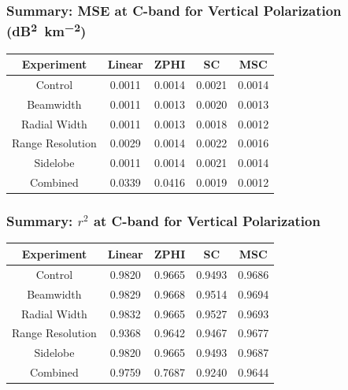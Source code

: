\documentclass[red]{beamer}
\begin{document}
\begin{frame}
    \frametitle{Summary: MSE at C-band for Vertical Polarization (\si{dB\squared\per \kilo\meter\squared})}
    \begin{center}
        \begin{tabular}{| c | c | c | c | c |}
            \hline
            Experiment & Linear & ZPHI & SC & MSC \\
            \hline
            \hline
            Control & 0.0011 & 0.0014 & 0.0021 & 0.0014 \\
            Beamwidth & 0.0011 & 0.0013 & 0.0020 & 0.0013 \\
            Radial Width & 0.0011 & 0.0013 & 0.0018 & 0.0012 \\
            Range Resolution & 0.0029 & 0.0014 & 0.0022 & 0.0016 \\
            Sidelobe & 0.0011 & 0.0014 & 0.0021 & 0.0014 \\
            Combined & 0.0339 & 0.0416 & 0.0019 & 0.0012 \\
            \hline
        \end{tabular}
    \end{center}
\end{frame}

\begin{frame}
    \frametitle{Summary: $r^2$ at C-band for Vertical Polarization}
    \begin{center}
        \begin{tabular}{| c | c | c | c | c |}
            \hline
            Experiment & Linear & ZPHI & SC & MSC \\
            \hline
            \hline
            Control & 0.9820 & 0.9665 & 0.9493 & 0.9686 \\
            Beamwidth & 0.9829 & 0.9668 & 0.9514 & 0.9694 \\
            Radial Width & 0.9832 & 0.9665 & 0.9527 & 0.9693 \\
            Range Resolution & 0.9368 & 0.9642 & 0.9467 & 0.9677 \\
            Sidelobe & 0.9820 & 0.9665 & 0.9493 & 0.9687 \\
            Combined & 0.9759 & 0.7687 & 0.9240 & 0.9644 \\
            \hline
        \end{tabular}
    \end{center}
\end{frame}
\end{document}
